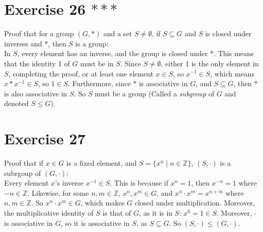 \documentclass{article}
\newcommand{\Z}{\mathbb{Z}}
\begin{document}
    \section*{Exercise 26 $***$}
    Proof that for a group $(G, \ast)$ and a set $S \neq \emptyset$,
    if $S \subseteq G$ and $S$ is closed under inverses and $\ast$,
    then $S$ is a group: \\
    In $S$, every element has an inverse,
    and the group is closed under $\ast$.
    This means that the identity 1 of $G$ must be in $S$.
    Since $S \neq \emptyset$,
    either 1 is the only element in $S$, completing the proof,
    or at least one element $x \in S$,
    so $x^{-1} \in S$,
    which means $x \ast x^{-1} \in S$,
    so $1 \in S$.
    Furthermore, since $\ast$ is associative in $G$,
    and $S \subseteq G$,
    then $\ast$ is also associative in $S$.
    So $S$ must be a group
    (Called a \textit{subgroup} of $G$ and denoted $S \leqslant G$).


    \section*{Exercise 27}
    Proof that if $x \in G$ is a fixed element,
    and $S = \{x^n \mid n \in \Z\}$,
    $(S, \cdot)$ is a subrgoup of $(G, \cdot)$: \\
    Every element $x$'s inverse $x^{-1} \in S$.
    This is because if $x^n = 1$,
    then $x^{-n} = 1$ where $-n \in \Z$.
    Likewise, for some $n, m \in \Z$, $x^n, x^m \in G$,
    and $x^n \cdot x^m = x^{n+m}$ where $n, m \in \Z$.
    So $x^n \cdot x^m \in G$, which makes $G$ closed under multiplication. 
    Moreover, the multiplicative identity of $S$ is that of $G$,
    as it is in $S$: $x^0 = 1 \in S$.
    Moreover, $\cdot$ is associative in $G$,
    so it is associative in $S$, as $S \subseteq G$.
    So $(S, \cdot) \leqslant (G, \cdot)$.
\end{document}
